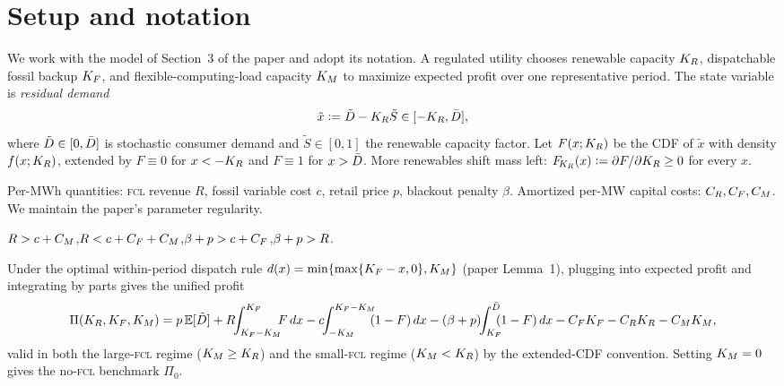 \section{Setup and notation}\label{r1w1-sec:setup}

We work with the model of Section~3 of the paper and adopt its notation. A
regulated utility chooses renewable capacity $K_R$, dispatchable fossil backup
$K_F$, and flexible-computing-load capacity $K_M$ to maximize expected profit
over one representative period. The state variable is \emph{residual demand}
\begin{equation}\label{r1w1-eq:resdem}
  \tilde x \vcentcolon= \tilde D - K_R\tilde S \in[-K_R,\bar D],
\end{equation}
where $\tilde D\in[0,\bar D]$ is stochastic consumer demand and
$\tilde S\in[0,1]$ the renewable capacity factor. Let $F(x;K_R)$ be the CDF of
$\tilde x$ with density $f(x;K_R)$, extended by $F\equiv0$ for $x<-K_R$ and
$F\equiv1$ for $x>\bar D$. More renewables shift mass left:
$F_{\!K_R}(x)\vcentcolon=\partial F/\partial K_R\ge 0$ for every $x$.

Per-MWh quantities: \textsc{fcl} revenue $R$, fossil variable cost $c$, retail
price $p$, blackout penalty $\beta$. Amortized per-MW capital costs:
$C_R,C_F,C_M$. We maintain the paper's parameter regularity.

\begin{assumption}[Regularity]\label{r1w1-ass:reg}
$R>c+C_M$,\quad $R<c+C_F+C_M$,\quad $\beta+p>c+C_F$,\quad $\beta+p>R$.
\end{assumption}

Under the optimal within-period dispatch rule
$d(x)=\min\{\max\{K_F-x,0\},K_M\}$ (paper Lemma~1), plugging into expected
profit and integrating by parts gives the unified profit
\begin{equation}\label{r1w1-eq:profit}
  \Pi(\KR,\KF,\KM)=p\,\E[\tilde D]
  +R\!\!\int_{\KF-\KM}^{\KF}\!\!\!F\,dx
  -c\!\!\int_{-\KM}^{\KF-\KM}\!\!\!(1-F)\,dx
  -(\bp)\!\!\int_{\KF}^{\Dbar}\!\!\!(1-F)\,dx
  -\CF\KF-\CR\KR-\CM\KM ,
\end{equation}
valid in both the large-\textsc{fcl} regime ($K_M\ge K_R$) and the
small-\textsc{fcl} regime ($K_M<K_R$) by the extended-CDF convention. Setting
$K_M=0$ gives the no-\textsc{fcl} benchmark $\Pi_0$.

